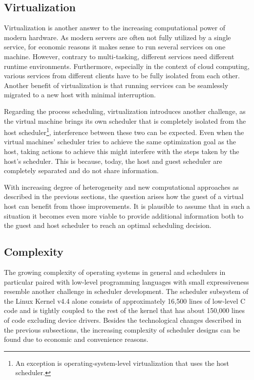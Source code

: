 \subsection{Virtualization}

Virtualization is another answer to the increasing computational power of modern hardware. As modern servers are often not fully utilized by a single service, for economic reasons it makes sense to run several services on one machine. However, contrary to multi-tasking, different services need different runtime environments. Furthermore, especially in the context of cloud computing, various services from different clients have to be fully isolated from each other. Another benefit of virtualization is that running services can be seamlessly migrated to a new host with minimal interruption.

Regarding the process scheduling, virtualization introduces another challenge, as the virtual machine brings its own scheduler that is completely isolated from the host scheduler\footnote{An exception is operating-system-level virtualization that uses the host scheduler.}, interference between these two can be expected. Even when the virtual machines' scheduler tries to achieve the same optimization goal as the host, taking actions to achieve this might interfere with the steps taken by the host's scheduler. This is because, today, the host and guest scheduler are completely separated and do not share information.

With increasing degree of heterogeneity and new computational approaches as described in the previous sections, the question arises how the guest of a virtual host can benefit from those improvements. It is plausible to assume that in such a situation it becomes even more viable to provide additional information both to the guest and host scheduler to reach an optimal scheduling decision.

\subsection{Complexity}

The growing complexity of operating systems in general and schedulers in particular paired with low-level programming languages with small expressiveness resemble another challenge in scheduler development. The scheduler subsystem \eg{} of the Linux Kernel v4.4 alone consists of approximately 16,500 lines of low-level C code and is tightly coupled to the rest of the kernel that has about 150,000 lines of code excluding device drivers. Besides the technological changes described in the previous subsections, the increasing complexity of scheduler designs can be found due to economic and convenience reasons.

